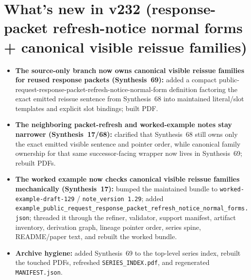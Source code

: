 \documentclass[11pt]{article}
\begin{document}
\section{What's new in v232 (response-packet refresh-notice normal forms + canonical visible reissue families)}
\begin{itemize}[leftmargin=*]
\item \textbf{The source-only branch now owns canonical visible reissue families for reused response packets (Synthesis~69):} added a compact public-request-response-packet-refresh-notice-normal-form definition factoring the exact emitted reissue sentence from Synthesis~68 into maintained literal/slot templates and explicit slot bindings; built PDF.
\item \textbf{The neighboring packet-refresh and worked-example notes stay narrower (Synthesis~17/68):} clarified that Synthesis~68 still owns only the exact emitted visible sentence and pointer order, while canonical family ownership for that same successor-facing wrapper now lives in Synthesis~69; rebuilt PDFs.
\item \textbf{The worked example now checks canonical visible reissue families mechanically (Synthesis~17):} bumped the maintained bundle to \texttt{worked-example-draft-129} / \texttt{note\_version 1.29}; added \texttt{example\_public\_request\_response\_packet\_refresh\_notice\_normal\_forms.json}; threaded it through the refiner, validator, support manifest, artifact inventory, derivation graph, lineage pointer order, series spine, README/paper text, and rebuilt the worked bundle.
\item \textbf{Archive hygiene:} added Synthesis~69 to the top-level series index, rebuilt the touched PDFs, refreshed \texttt{SERIES\_INDEX.pdf}, and regenerated \texttt{MANIFEST.json}.
\end{itemize}
\end{document}
